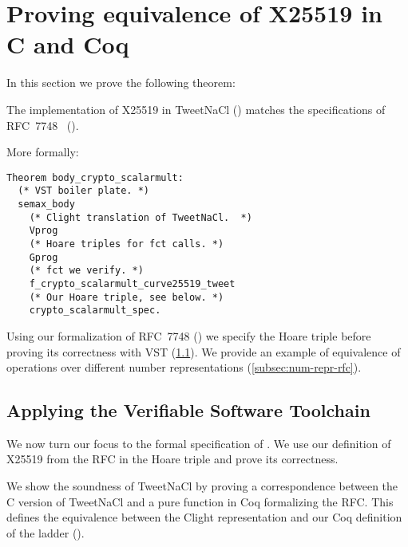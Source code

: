 \section{Proving equivalence of X25519 in C and Coq}
\label{sec:C-Coq}

In this section we prove the following theorem:

\begin{informaltheorem}
      The implementation of X25519 in TweetNaCl () matches
      the specifications of RFC~7748~\cite{rfc7748} ().
\end{informaltheorem}

More formally:
\begin{lstlisting}[language=Coq]
Theorem body_crypto_scalarmult:
  (* VST boiler plate. *)
  semax_body
    (* Clight translation of TweetNaCl.  *)
    Vprog
    (* Hoare triples for fct calls. *)
    Gprog
    (* fct we verify. *)
    f_crypto_scalarmult_curve25519_tweet
    (* Our Hoare triple, see below. *)
    crypto_scalarmult_spec.
\end{lstlisting}

Using our formalization of RFC~7748 () we specify the Hoare
triple before proving its correctness with VST (\ref{subsec:with-VST}).
We provide an example of equivalence of operations over different number
representations (\ref{subsec:num-repr-rfc}).


\subsection{Applying the Verifiable Software Toolchain}
\label{subsec:with-VST}

\begin{sloppypar}
      We now turn our focus to the formal specification of .
      We use our definition of X25519 from the RFC in the Hoare triple and prove
      its correctness.
\end{sloppypar}

We show the soundness of TweetNaCl by proving a correspondence between
the C version of TweetNaCl and a pure function in Coq formalizing the RFC.
This defines the equivalence between the Clight representation and our Coq
definition of the ladder ().

